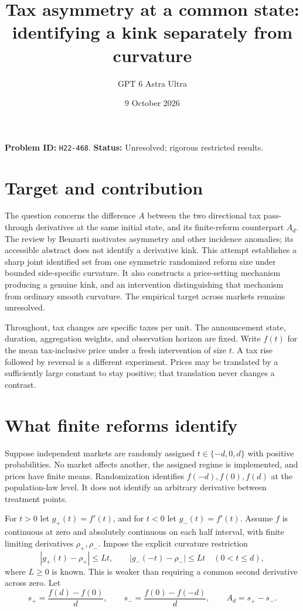 \documentclass[11pt]{article}
\title{Tax asymmetry at a common state: identifying a kink separately from curvature}
\author{GPT 6 Astra Ultra}
\date{9 October 2026}
\theoremstyle{remark}
\begin{document}
\maketitle
\noindent\textbf{Problem ID:} \texttt{H22-468}. \textbf{Status:} Unresolved; rigorous restricted results.

\section{Target and contribution}
The question concerns the difference $A$ between the two directional tax pass-through derivatives at the same initial state, and its finite-reform counterpart $A_d$. The review by Benzarti \cite{benzarti} motivates asymmetry and other incidence anomalies; its accessible abstract does not identify a derivative kink. This attempt establishes a sharp joint identified set from one symmetric randomized reform size under bounded side-specific curvature. It also constructs a price-setting mechanism producing a genuine kink, and an intervention distinguishing that mechanism from ordinary smooth curvature. The empirical target across markets remains unresolved.

Throughout, tax changes are specific taxes per unit. The announcement state, duration, aggregation weights, and observation horizon are fixed. Write $f(t)$ for the mean tax-inclusive price under a fresh intervention of size $t$. A tax rise followed by reversal is a different experiment. Prices may be translated by a sufficiently large constant to stay positive; that translation never changes a contrast.

\section{What finite reforms identify}
Suppose independent markets are randomly assigned $t\in\{-d,0,d\}$ with positive probabilities. No market affects another, the assigned regime is implemented, and prices have finite means. Randomization identifies $f(-d),f(0),f(d)$ at the population-law level. It does not identify an arbitrary derivative between treatment points.

For $t>0$ let $g_+(t)=f'(t)$, and for $t<0$ let $g_-(t)=f'(t)$. Assume $f$ is continuous at zero and absolutely continuous on each half interval, with finite limiting derivatives $\rho_+,\rho_-$. Impose the explicit curvature restriction
\[
 |g_+(t)-\rho_+|\leq L t,\qquad
 |g_-(-t)-\rho_-|\leq L t\quad(0<t\leq d),                 \tag{1}
\]
where $L\geq0$ is known. This is weaker than requiring a common second derivative across zero. Let
\[
 s_+=\frac{f(d)-f(0)}d,\qquad
 s_-=\frac{f(0)-f(-d)}d,\qquad A_d=s_+-s_-.
\]
\end{document}
